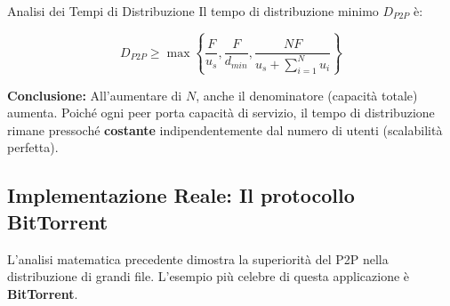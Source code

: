 \documentclass[a4paper,12pt]{report}
\begin{document}
\begin{esempiobox}{Analisi dei Tempi di Distribuzione}
Il tempo di distribuzione minimo $D_{P2P}$ è:

\begin{equation}
D_{P2P} \ge \max \left\{ \frac{F}{u_s}, \frac{F}{d_{min}}, \frac{NF}{u_s + \sum_{i=1}^{N} u_i} \right\}
\end{equation}

\textbf{Conclusione:} All'aumentare di $N$, anche il denominatore (capacità totale) aumenta. Poiché ogni peer porta capacità di servizio, il tempo di distribuzione rimane pressoché \textbf{costante} indipendentemente dal numero di utenti (scalabilità perfetta).

\end{esempiobox}



\newpage
\subsection*{Implementazione Reale: Il protocollo BitTorrent}

L'analisi matematica precedente dimostra la superiorità del P2P nella distribuzione di grandi file. L'esempio più celebre di questa applicazione è \textbf{BitTorrent}.
\end{document}
